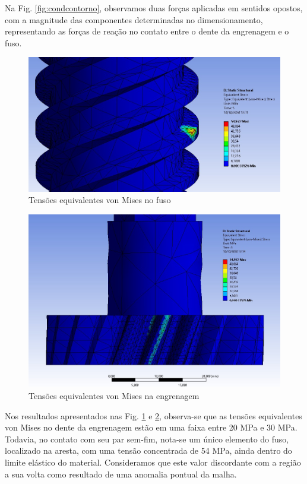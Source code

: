 Na Fig. \ref{fig:condcontorno}, observamos duas forças aplicadas em sentidos opostos, com a magnitude das componentes determinadas no dimensionamento, representando as forças de reação no contato entre o dente da engrenagem e o fuso.

\begin{figure}[ht]
        \centering
        \includegraphics[width=.8\textwidth]{figuras/estrutura/InteracaoFusoEng/tensao fuso.jpeg}
        \caption{Tensões equivalentes von Mises no fuso}
        \label{fig:tensaofuso}
    \end{figure}
    
\begin{figure}[ht]
        \centering
        \includegraphics[width=.8\textwidth]{figuras/estrutura/InteracaoFusoEng/tensao engrenagem.jpeg}
        \caption{Tensões equivalentes von Mises na engrenagem}
        \label{fig:tensaoeng}
    \end{figure}    

Nos resultados apresentados nas Fig. \ref{fig:tensaofuso} e \ref{fig:tensaoeng}, observa-se que as tensões equivalentes von Mises no dente da engrenagem estão em uma faixa entre 20 MPa e 30 MPa. Todavia, no contato com seu par sem-fim, nota-se um único elemento do fuso, localizado na aresta, com uma tensão concentrada de 54 MPa, ainda dentro do limite elástico do material. Consideramos que este valor discordante com a região a sua volta como resultado de uma anomalia pontual da malha.

